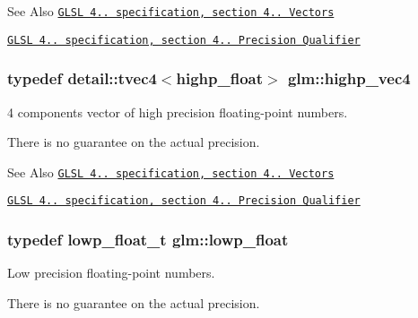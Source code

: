\begin{DoxySeeAlso}{See Also}
\href{http://www.opengl.org/registry/doc/GLSLangSpec.4.20.8.pdf}{\tt G\-L\-S\-L 4.. specification, section 4.. Vectors} 

\href{http://www.opengl.org/registry/doc/GLSLangSpec.4.20.8.pdf}{\tt G\-L\-S\-L 4.. specification, section 4.. Precision Qualifier} 
\end{DoxySeeAlso}
\hypertarget{group__core__precision_ga78dab0bca921cd9a1e1206ee3cf01207}{
\subsubsection[{highp\-\_\-vec4}]{\setlength{\rightskip}{0pt plus 5cm}typedef detail\-::tvec4$<$highp\-\_\-float$>$ {\bf glm\-::highp\-\_\-vec4}}}\label{group__core__precision_ga78dab0bca921cd9a1e1206ee3cf01207}


4 components vector of high precision floating-\/point numbers. 

There is no guarantee on the actual precision.

\begin{DoxySeeAlso}{See Also}
\href{http://www.opengl.org/registry/doc/GLSLangSpec.4.20.8.pdf}{\tt G\-L\-S\-L 4.. specification, section 4.. Vectors} 

\href{http://www.opengl.org/registry/doc/GLSLangSpec.4.20.8.pdf}{\tt G\-L\-S\-L 4.. specification, section 4.. Precision Qualifier} 
\end{DoxySeeAlso}
\hypertarget{group__core__precision_ga2887fbc729ac5c1c5caeb7cd57a7145c}{
\subsubsection[{lowp\-\_\-float}]{\setlength{\rightskip}{0pt plus 5cm}typedef lowp\-\_\-float\-\_\-t {\bf glm\-::lowp\-\_\-float}}}\label{group__core__precision_ga2887fbc729ac5c1c5caeb7cd57a7145c}


Low precision floating-\/point numbers. 

There is no guarantee on the actual precision.

